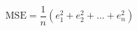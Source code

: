 \documentclass[preview]{standalone}
\begin{document}
\begin{align*}
\text{MSE} = \dfrac{1}{n}( e_1^2+e_2^2+\ldots+e_n^2)
\end{align*}
\end{document}

